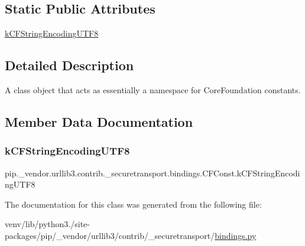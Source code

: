 \subsection*{Static Public Attributes}
\begin{DoxyCompactItemize}
\item 
\hyperlink{classpip_1_1__vendor_1_1urllib3_1_1contrib_1_1__securetransport_1_1bindings_1_1CFConst_a0bd3090d175133eaac7e6eaf1f5bb24a}{k\+C\+F\+String\+Encoding\+U\+T\+F8}
\end{DoxyCompactItemize}


\subsection{Detailed Description}
\begin{DoxyVerb}A class object that acts as essentially a namespace for CoreFoundation
constants.
\end{DoxyVerb}
 

\subsection{Member Data Documentation}
\mbox{\label{classpip_1_1__vendor_1_1urllib3_1_1contrib_1_1__securetransport_1_1bindings_1_1CFConst_a0bd3090d175133eaac7e6eaf1f5bb24a}} 
\subsubsection{\texorpdfstring{k\+C\+F\+String\+Encoding\+U\+T\+F8}{kCFStringEncodingUTF8}}
{\footnotesize\ttfamily pip.\+\_\+vendor.\+urllib3.\+contrib.\+\_\+securetransport.\+bindings.\+C\+F\+Const.\+k\+C\+F\+String\+Encoding\+U\+T\+F8\hspace{0.3cm}{\ttfamily [static]}}



The documentation for this class was generated from the following file\+:\begin{DoxyCompactItemize}
\item 
venv/lib/python3./site-\/packages/pip/\+\_\+vendor/urllib3/contrib/\+\_\+securetransport/\hyperlink{bindings_8py}{bindings.\+py}\end{DoxyCompactItemize}
